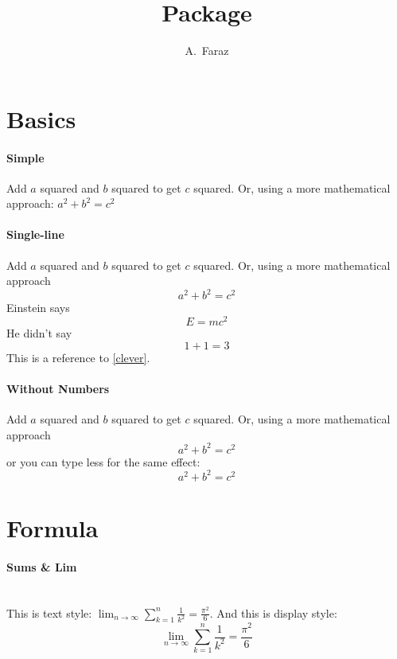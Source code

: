 \documentclass[a4paper,11pt]{article}
\author{A.~Faraz}
\title{\AmS{} Package}
\begin{document}
\maketitle
\tableofcontents
\pagebreak
\section{Basics}
\paragraph{Simple}
	Add $a$ squared and $b$ squared
	to get $c$ squared. Or, using
	a more mathematical approach:
	$a^2 + b^2 = c^2$
	
\paragraph{Single-line}
	Add $a$ squared and $b$ squared
	to get $c$ squared. Or, using
	a more mathematical approach
	\begin{equation}
	a^2 + b^2 = c^2
	\end{equation}
	Einstein says
	\begin{equation}
	E = mc^2 \label{clever}
	\end{equation}
	He didn’t say
	\begin{equation}
	1 + 1 = 3 \tag{dumb}
	\end{equation}
	This is a reference to
	\eqref{clever}.

\paragraph{Without Numbers}
	Add $a$ squared and $b$ squared
	to get $c$ squared. Or, using
	a more mathematical approach
	\begin{equation*}
	a^2 + b^2 = c^2
	\end{equation*}
	or you can type less for the
	same effect:
	\[ a^2 + b^2 = c^2 \]
	
\pagebreak
\section{Formula}
\paragraph{Sums \& Lim} 
\mbox{}\\
This is text style:
$\lim_{n \to \infty}
\sum_{k=1}^n \frac{1}{k^2}
= \frac{\pi^2}{6}$.
And this is display style:
\begin{equation}
\lim_{n \rightarrow \infty}
\sum_{k=1}^n \frac{1}{k^2}
= \frac{\pi^2}{6}
\end{equation}
\end{document}
